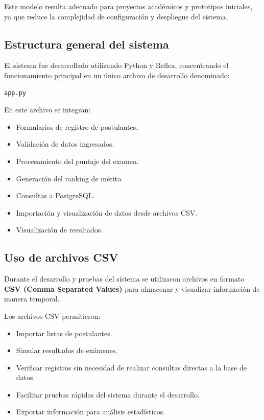 \documentclass[12pt, a4paper]{report}
\begin{document}
Este modelo resulta adecuado para proyectos académicos y prototipos iniciales, ya que reduce la complejidad de configuración y despliegue del sistema.

\subsection{Estructura general del sistema}

El sistema fue desarrollado utilizando Python y Reflex, concentrando el funcionamiento principal en un único archivo de desarrollo denominado:

\begin{verbatim}
app.py
\end{verbatim}

En este archivo se integran:

\begin{itemize}[noitemsep]
  \item Formularios de registro de postulantes.
  
  \item Validación de datos ingresados.
  
  \item Procesamiento del puntaje del examen.
  
  \item Generación del ranking de mérito.
  
  \item Consultas a PostgreSQL.
  
  \item Importación y visualización de datos desde archivos CSV.
  
  \item Visualización de resultados.
\end{itemize}

\subsection{Uso de archivos CSV}

Durante el desarrollo y pruebas del sistema se utilizaron archivos en formato \textbf{CSV (Comma Separated Values)} para almacenar y visualizar información de manera temporal.

Los archivos CSV permitieron:

\begin{itemize}[noitemsep]
  \item Importar listas de postulantes.
  
  \item Simular resultados de exámenes.
  
  \item Verificar registros sin necesidad de realizar consultas directas a la base de datos.
  
  \item Facilitar pruebas rápidas del sistema durante el desarrollo.
  
  \item Exportar información para análisis estadísticos.
\end{itemize}
\end{document}
